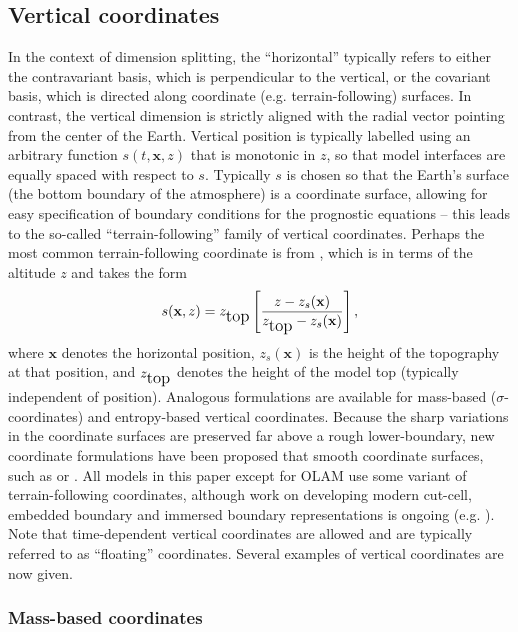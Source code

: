 \documentclass[gmd, manuscript]{copernicus}
\newcommand{\vb}{\mathbf}
\begin{document}
\subsection{Vertical coordinates} \label{sec:VerticalCoordinates}

In the context of dimension splitting, the ``horizontal'' typically refers to either the contravariant basis, which is perpendicular to the vertical, or the covariant basis, which is directed along coordinate (e.g. terrain-following) surfaces.  In contrast, the vertical dimension is strictly aligned with the radial vector pointing from the center of the Earth.  Vertical position is typically labelled using an arbitrary function $s(t,\vb{x},z)$ that is monotonic in $z$, so that model interfaces are equally spaced with respect to $s$.  Typically $s$ is chosen so that the Earth's surface (the bottom boundary of the atmosphere) is a coordinate surface, allowing for easy specification of boundary conditions for the prognostic equations -- this leads to the so-called ``terrain-following'' family of vertical coordinates.  Perhaps the most common terrain-following coordinate is from \cite{galchen1975}, which is in terms of the altitude $z$ and takes the form
\begin{align}
s(\vb{x},z) = z_{\footnotesize \mbox{top}} \left[ \frac{z - z_s(\vb{x})}{z_{\footnotesize \mbox{top}} - z_s(\vb{x})} \right],
\end{align} where $\vb{x}$ denotes the horizontal position, $z_s(\vb{x})$ is the height of the topography at that position, and $z_{\footnotesize \mbox{top}}$ denotes the height of the model top (typically independent of position).  Analogous formulations are available for mass-based ($\sigma$-coordinates) and entropy-based vertical coordinates.  Because the sharp variations in the coordinate surfaces are preserved far above a rough lower-boundary, new coordinate formulations have been proposed that smooth coordinate surfaces, such as \cite{schar2002new} or \cite{klemp2011terrain}.  All models in this paper except for OLAM use some variant of terrain-following coordinates, although work on developing modern cut-cell, embedded boundary and immersed boundary representations is ongoing (e.g. \cite{lock2012demonstration}).  Note that time-dependent vertical coordinates are allowed and are typically referred to as ``floating'' coordinates.  Several examples of vertical coordinates are now given.

\subsubsection{Mass-based coordinates}
\end{document}
